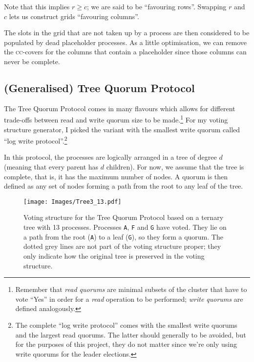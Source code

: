 \documentclass[11pt,chapterprefix=true,toc=bibliography,numbers=noendperiod,
               footnotes=multiple,twoside]{scrreprt}
\begin{document}
Note that this implies \(r \geq c\); we are said to be \enquote{favouring rows}. Swapping \(r\) and \(c\) lets us construct grids \enquote{favouring columns}.

The slots in the grid that are not taken up by a process are then considered to be populated by dead placeholder processes. As a little optimisation, we can remove the \textsc{cc}-covers for the columns that contain a placeholder since those columns can never be complete.

\subsection{(Generalised) Tree Quorum Protocol\label{ssc:tree}}

The Tree Quorum Protocol \autocite{tree} comes in many flavours which allows for different trade-offs between read and write quorum size to be made.\footnote{Remember that \emph{read quorums} are minimal subsets of the cluster that have to vote \enquote{Yes} in order for a \emph{read} operation to be performed; \emph{write quorums} are defined analogously.} For my voting structure generator, I picked the variant with the smallest write quorum called \enquote{log write protocol}.\footnote{The complete \enquote{log write protocol} comes with the smallest write quorums and the largest read quorums. The latter should generally to be avoided, but for the purposes of this project, they do not matter since we're only using write quorums for the leader elections.}

In this protocol, the processes are logically arranged in a tree of degree \(d\) (meaning that every parent has \(d\) children). For now, we assume that the tree is complete, that is, it has the maximum number of nodes. A quorum is then defined as any set of nodes forming a path from the root to any leaf of the tree.

\begin{figure}[h]
    \centering
    \texttt{[image: Images/Tree3\_13.pdf]}
    \caption{Voting structure for the Tree Quorum Protocol based on a ternary tree with 13 processes. Processes \texttt{A}, \texttt{F} and \texttt{G} have voted. They lie on a path from the root (\texttt{A}) to a leaf (\texttt{G}), so they form a quorum. The dotted grey lines are not part of the voting structure proper; they only indicate how the original tree is preserved in the voting structure.}
    \label{fig:grid3_13}
\end{figure}
\end{document}
